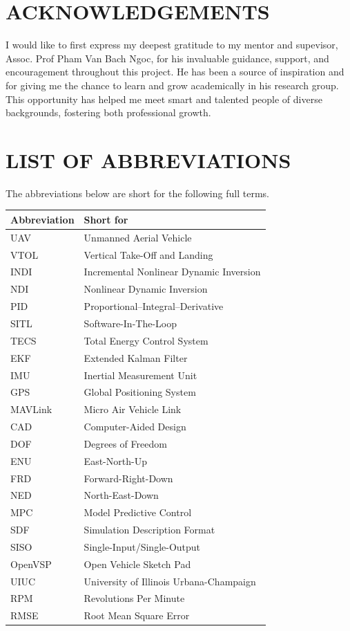 \documentclass{article}
\begin{document}
\renewcommand{\contentsname}{Table of Contents}
\tableofcontents
\newpage

\section*{ACKNOWLEDGEMENTS}
I would like to first express my deepest gratitude to my mentor and supevisor, Assoc. Prof Pham Van Bach Ngoc, for his invaluable guidance, support, and encouragement throughout this project. He has been a source of inspiration and for giving me the chance to learn and grow academically in his research group. This opportunity has helped me meet smart and talented people of diverse backgrounds, fostering both professional growth.

\newpage
\section*{LIST OF ABBREVIATIONS}
\noindent The abbreviations below are short for the following full terms.
\par\vspace{0.5\baselineskip}
\begin{longtable}{p{}p{}}
\textbf{Abbreviation} & \textbf{Short for} \\
\midrule
UAV & Unmanned Aerial Vehicle \\
VTOL & Vertical Take-Off and Landing \\
INDI & Incremental Nonlinear Dynamic Inversion \\
NDI & Nonlinear Dynamic Inversion \\
PID & Proportional--Integral--Derivative \\
SITL & Software-In-The-Loop \\
TECS & Total Energy Control System \\
EKF & Extended Kalman Filter \\
IMU & Inertial Measurement Unit \\
GPS & Global Positioning System \\
MAVLink & Micro Air Vehicle Link \\
CAD & Computer-Aided Design \\
DOF & Degrees of Freedom \\
ENU & East-North-Up \\
FRD & Forward-Right-Down \\
NED & North-East-Down \\
MPC & Model Predictive Control \\
SDF & Simulation Description Format \\
SISO & Single-Input/Single-Output \\
OpenVSP & Open Vehicle Sketch Pad \\
UIUC & University of Illinois Urbana-Champaign \\
RPM & Revolutions Per Minute \\
RMSE & Root Mean Square Error \\
\end{longtable}
\end{document}
